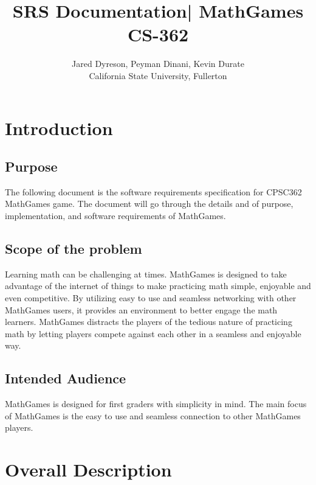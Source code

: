 \documentclass[12pt]{article}
\title{SRS Documentation| MathGames CS-362}
\author{Jared Dyreson, Peyman Dinani, Kevin Durate \\
        California State University, Fullerton}
\date
\begin{document}
\begin{titlingpage}
\maketitle
\end{titlingpage}

\newpage

\tableofcontents

\newpage

\section{Introduction}

\subsection{Purpose}

The following document is the software requirements specification for CPSC362 MathGames game. 
The document will go through the details and of purpose, implementation, and software requirements of MathGames.

\subsection{Scope of the problem}

Learning math can be challenging at times. 
MathGames is designed to take advantage of the internet of things to make practicing math simple, enjoyable and even competitive. 
By utilizing easy to use and seamless networking with other MathGames users, it provides an environment to better engage the math learners. 
MathGames distracts the players of the tedious nature of practicing math by letting players compete against each other in a seamless and enjoyable way.    

\subsection{Intended Audience}

MathGames is designed for first graders with simplicity in mind. 
The main focus of MathGames is the easy to use and seamless connection to other MathGames players.

\newpage

\section{Overall Description}
\end{document}
